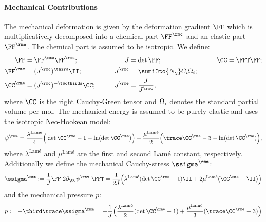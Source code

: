 \paragraph{Mechanical Contributions} %
  The mechanical deformation is given by the deformation gradient $\FF$ which is multiplicatively decomposed into a chemical part $\FFc$ and an elastic part $\FFe$. The chemical part is assumed to be isotropic. We define:
  \begin{alignat}{3}
    \FF &= \FFe\FFc;& \qquad J&=\det\FF; & \qquad\CC&=\FFT\FF;\\
    \FFc &= (\Jc)^{\third} \II;& \qquad  \Jc &= \sumiOto{\Nchi} C_i\Omeganordi; &  \\
    \CCe &= (\Jc)^{-\twothirds} \CC;& \qquad \Je &= \frac{J}{\Jc}, & 
  \end{alignat} 
  where $\CC$ is the right Cauchy-Green tensor and $\Omega_i$ denotes the standard partial volume per mol. The mechanical energy is assumed to be purely elastic and uses the isotropic Neo-Hookean model:
  \begin{align}
    \psim = \frac{\lambda^{\text{Lam\'e}}}{4}\Big(\det\CCe-1-\ln(\det\CCe)\Big) + \frac{\mu^{\text{Lam\'e}}}{2}\Big(\trace\CCe-3-\ln(\det\CCe)\Big),
  \end{align}
  where $\lambda^{\text{Lam\'e}}$ and $\mu^{\text{Lam\'e}}$ are the first and second Lam\'e constant, respectively. Additionally we define the mechanical Cauchy-stress $\ssigmam$:
  \begin{align}
    \ssigma^\rmm := \frac{1}{J}\FF\ 2\dCC\psim\ \FFT = \frac{1}{2J}\Big(\lambda^{\text{Lam\'e}}(\det\CCe-1)\II + 2\mu^{\text{Lam\'e}}(\CCe-\II)\Big)
  \end{align}
  and the mechanical pressure $p$:
  \begin{align}
    p := -\third\trace\ssigma^\rmm = -\frac{1}{J}\Big(\frac{\lambda^{\text{Lam\'e}}}{2}(\det\CCe-1)+\frac{\mu^{\text{Lam\'e}}}{3}(\trace\CCe-3)\Big)
  \end{align}



